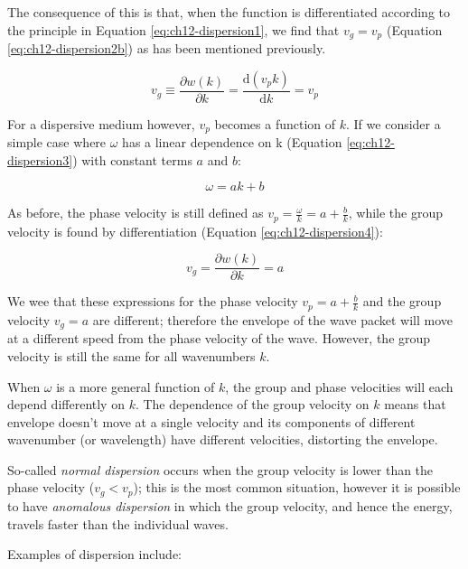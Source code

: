 \documentclass[
]{book}
\begin{document}
The consequence of this is that, when the function is differentiated according to the principle in Equation \eqref{eq:ch12-dispersion1}, we find that \(v_g = v_p\) (Equation \eqref{eq:ch12-dispersion2b}) as has been mentioned previously.

\begin{equation}
v_g \equiv \frac{\partial w(k)}{\partial k} = \frac{\mathrm{d} (v_p k)}{\mathrm{d}k} = v_p
\label{eq:ch12-dispersion2b}
\end{equation}

For a dispersive medium however, \(v_p\) becomes a function of \(k\). If we consider a simple case where \(\omega\) has a linear dependence on k (Equation \eqref{eq:ch12-dispersion3}) with constant terms \(a\) and \(b\):

\begin{equation}
\omega = ak + b
\label{eq:ch12-dispersion3}
\end{equation}

As before, the phase velocity is still defined as \(v_p = \frac{\omega}{k} = a + \frac{b}{k}\), while the group velocity is found by differentiation (Equation \eqref{eq:ch12-dispersion4}):

\begin{equation}
v_g = \frac{\partial w(k)}{\partial k} = a
\label{eq:ch12-dispersion4}
\end{equation}

We wee that these expressions for the phase velocity \(v_p = a + \frac{b}{k}\) and the group velocity \(v_g = a\) are different; therefore the envelope of the wave packet will move at a different speed from the phase velocity of the wave. However, the group velocity is still the same for all wavenumbers \(k\).

When \(\omega\) is a more general function of \(k\), the group and phase velocities will each depend differently on \(k\). The dependence of the group velocity on \(k\) means that envelope doesn't move at a single velocity and its components of different wavenumber (or wavelength) have different velocities, distorting the envelope.

So-called \emph{normal dispersion} occurs when the group velocity is lower than the phase velocity (\(v_g < v_p\)); this is the most common situation, however it is possible to have \emph{anomalous dispersion} in which the group velocity, and hence the energy, travels faster than the individual waves.

Examples of dispersion include:
\end{document}
